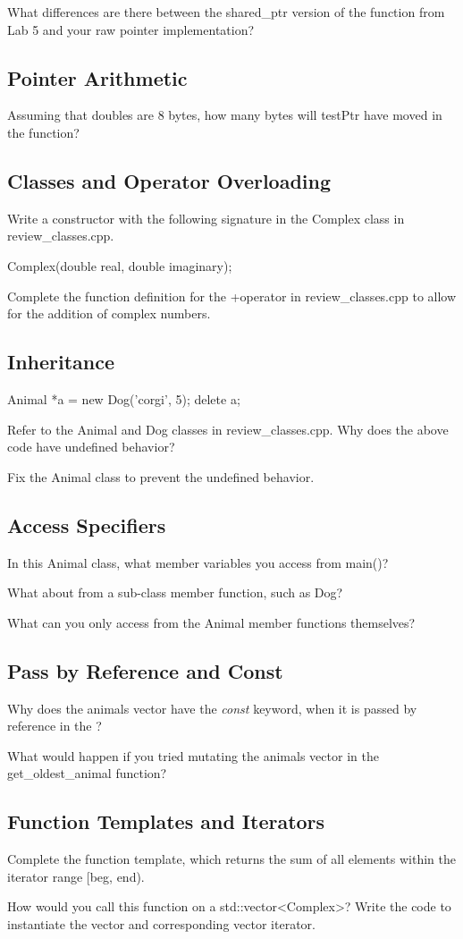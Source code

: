 \documentclass{tufte-handout}
\begin{document}
What differences are there between the shared\_ptr version of the function from Lab 5 and your raw pointer implementation?

\subsection{Pointer Arithmetic}
Assuming that doubles are 8 bytes, how many bytes will testPtr have moved in the  function?

\subsection{Classes and Operator Overloading}
Write a constructor with the following signature in the Complex class in review\_classes.cpp.

\begin{Code}
Complex(double real, double imaginary);
\end{Code}

Complete the function definition for the +operator in review\_classes.cpp to allow for the addition of complex numbers.

\subsection{Inheritance}
\begin{Code}
Animal *a = new Dog('corgi', 5);
delete a;
\end{Code}
Refer to the Animal and Dog classes in review\_classes.cpp. Why does the above code have undefined behavior? 

Fix the Animal class to prevent the undefined behavior.

\subsection{Access Specifiers}
In this Animal class, what member variables you access from main()?

What about from a sub-class member function, such as Dog?

What can you only access from the Animal member functions themselves?

\subsection{Pass by Reference and Const}
Why does the animals vector have the \textit{const} keyword, when it is passed by reference in the ?

What would happen if you tried mutating the animals vector in the get\_oldest\_animal function?

\subsection{Function Templates and Iterators}
Complete the  function template, which returns the sum of all elements within the iterator range [beg, end). 

How would you call this function on a std::vector<Complex>? Write the code to instantiate the vector and corresponding vector iterator.
\end{document}

